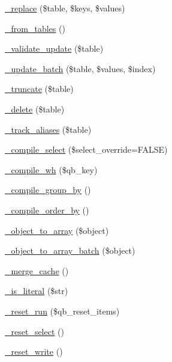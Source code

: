 \begin{DoxyCompactItemize}
\item 
\mbox{\hyperlink{class_c_i___d_b__query__builder_ae0adf73984daf2d42ad29b66c484c82b}{\+\_\+replace}} (\$table, \$keys, \$values)
\item 
\mbox{\hyperlink{class_c_i___d_b__query__builder_aef43f7e3e7b71d337ff3724c5eb14f10}{\+\_\+from\+\_\+tables}} ()
\item 
\mbox{\hyperlink{class_c_i___d_b__query__builder_a0da7b6bb840e0331733abafc14399a32}{\+\_\+validate\+\_\+update}} (\$table)
\item 
\mbox{\hyperlink{class_c_i___d_b__query__builder_a336b9ebb119e47b6a84bb7fc9d4dae93}{\+\_\+update\+\_\+batch}} (\$table, \$values, \$index)
\item 
\mbox{\hyperlink{class_c_i___d_b__query__builder_aa029600528fc1ce660a23ff4b4667f95}{\+\_\+truncate}} (\$table)
\item 
\mbox{\hyperlink{class_c_i___d_b__query__builder_a133ea8446ded52589bd22cc9163d0896}{\+\_\+delete}} (\$table)
\item 
\mbox{\hyperlink{class_c_i___d_b__query__builder_afb539c1557a7cb20a190f5b68d96b74a}{\+\_\+track\+\_\+aliases}} (\$table)
\item 
\mbox{\hyperlink{class_c_i___d_b__query__builder_a441f6e994a212cfa12dd33d92973915b}{\+\_\+compile\+\_\+select}} (\$select\+\_\+override=F\+A\+L\+SE)
\item 
\mbox{\hyperlink{class_c_i___d_b__query__builder_a3d2301b84734fd18a0db6d0602106f48}{\+\_\+compile\+\_\+wh}} (\$qb\+\_\+key)
\item 
\mbox{\hyperlink{class_c_i___d_b__query__builder_a953e760f382d7187dc5d7b238a7ff439}{\+\_\+compile\+\_\+group\+\_\+by}} ()
\item 
\mbox{\hyperlink{class_c_i___d_b__query__builder_a78ef026e2ca49e2b371f9cc577f6e777}{\+\_\+compile\+\_\+order\+\_\+by}} ()
\item 
\mbox{\hyperlink{class_c_i___d_b__query__builder_a50b3069661bbf4605b6b561f38eae849}{\+\_\+object\+\_\+to\+\_\+array}} (\$object)
\item 
\mbox{\hyperlink{class_c_i___d_b__query__builder_ab53f659c5df0b0b6d30eaab74f507dc5}{\+\_\+object\+\_\+to\+\_\+array\+\_\+batch}} (\$object)
\item 
\mbox{\hyperlink{class_c_i___d_b__query__builder_aeee4c0cf664e1a65d7eb8a3c8e9970c6}{\+\_\+merge\+\_\+cache}} ()
\item 
\mbox{\hyperlink{class_c_i___d_b__query__builder_a645d9af97f1d078041e8ae451fae9e1b}{\+\_\+is\+\_\+literal}} (\$str)
\item 
\mbox{\hyperlink{class_c_i___d_b__query__builder_aebc5876417533f3347aeae458ccde988}{\+\_\+reset\+\_\+run}} (\$qb\+\_\+reset\+\_\+items)
\item 
\mbox{\hyperlink{class_c_i___d_b__query__builder_a7c6cc16411b9c36fbfd42a9317f64317}{\+\_\+reset\+\_\+select}} ()
\item 
\mbox{\hyperlink{class_c_i___d_b__query__builder_ae49808f6becc0366eef957756c8309e4}{\+\_\+reset\+\_\+write}} ()
\end{DoxyCompactItemize}
